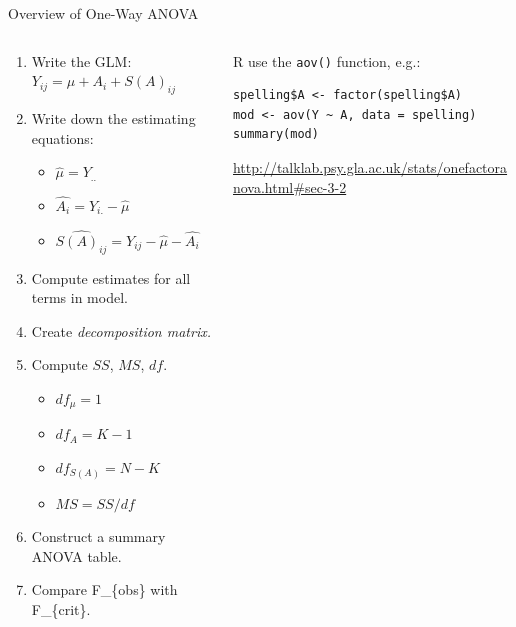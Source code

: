 \documentclass[presentation]{beamer}
\begin{document}
\begin{frame}[fragile,label={sec:orgb0a9f55}]{Overview of One-Way ANOVA}
 \begin{columns}
\begin{column}{.52\columnwidth}
\begin{scriptsize}
\begin{enumerate}
\item Write the GLM: \(Y_{ij} = \mu + A_i + S(A)_{ij}\)
\item Write down the estimating equations:
\begin{itemize}
\item \(\hat{\mu} = Y_{..}\)
\item \(\hat{A_i} = Y_{i.}-\hat{\mu}\)
\item \(\widehat{S(A)_{ij}} = Y_{ij}-\hat{\mu}-\hat{A_i}\)
\end{itemize}
\item Compute estimates for all terms in model.
\item Create \emph{decomposition matrix.}
\item Compute \(SS\), \(MS\), \(df\).
\begin{itemize}
\item \(df_{\mu}=1\)
\item \(df_{A}=K-1\)
\item \(df_{S(A)}=N-K\)
\item \(MS=SS/df\)
\end{itemize}
\item Construct a summary ANOVA table.
\item Compare F\_\{obs\} with F\_\{crit\}.
\end{enumerate}
\end{scriptsize}
\end{column}

\begin{column}{.45\columnwidth}
\begin{block}{R}
use the \texttt{aov()} function, e.g.:

\begin{verbatim}
spelling$A <- factor(spelling$A)
mod <- aov(Y ~ A, data = spelling)
summary(mod)
\end{verbatim}

\begin{tiny}

\url{http://talklab.psy.gla.ac.uk/stats/onefactoranova.html#sec-3-2}

\end{tiny}
\end{block}
\end{column}
\end{columns}
\end{frame}
\end{document}
